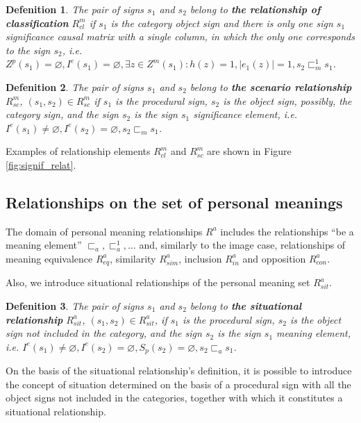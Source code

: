 \documentclass[12pt]{scrartcl}
\newtheorem{definition}{Defenition}
\begin{document}
	\begin{definition}
		The pair of signs $s_1$ and $s_2$ belong to \textbf{the relationship of classification} $R_{cl}^m$ if $s_1$ is the category object sign and there is only one sign $s_1$ significance causal matrix with a single column, in which the only one corresponds to the sign $s_2$, i.e. $Z^p(s_1)=\varnothing, I^e(s_1)=\varnothing, \exists z\in Z^m(s_1): h(z)=1, |e_1(z)|=1, s_2\sqsubset_m^1 s_1$.
	\end{definition}
	
	\begin{definition}
		The pair of signs $s_1$ and $s_2$ belong to \textbf{the scenario relationship} $R_{sc}^m$, $(s_1,s_2)\in R_{sc}^m$ if $s_1$ is the procedural sign, $s_2$ is the object sign, possibly, the category sign, and the sign $s_2$ is the sign $s_1$ significance element, i.e. $I^e(s_1)\not = \varnothing, I^e(s_2) = \varnothing, s_2\sqsubset_m s_1$.
	\end{definition}
	
	Examples of relationship elements $R_{cl}^m$ and $R_{sc}^m$ are shown in Figure \ref{fig:signif_relat}.
	
	\subsection{Relationships on the set of personal meanings}	
	The domain of personal meaning relationships $R^a$ includes the relationships ``be a meaning element'' ${\sqsubset_a,\sqsubset_a^1,\dots}$ and, similarly to the image case, relationships of meaning equivalence $R_{eq}^a$, similarity $R_{sim}^a$, inclusion $R_{in}^a$ and opposition $R_{con}^a$.
	
	Also, we introduce situational relationships of the personal meaning set $R_{sit}^a$.
	
	\begin{definition}
		The pair of signs $s_1$ and $s_2$ belong to \textbf{the situational relationship} $R_{sit}^a$, $(s_1,s_2)\in R_{sit}^a$, if $s_1$ is the procedural sign, $s_2$ is the object sign not included in the category, and the sign $s_2$ is the sign $s_1$ meaning element, i.e. $I^e(s_1)\not = \varnothing, I^e(s_2) = \varnothing, S_p(s_2)=\varnothing, s_2\sqsubset_a s_1$.
	\end{definition}
	
	On the basis of the situational relationship's definition, it is possible to introduce the concept of situation determined on the basis of a procedural sign with all the object signs not included in the categories, together with which it constitutes a situational relationship.
	
\end{document}
